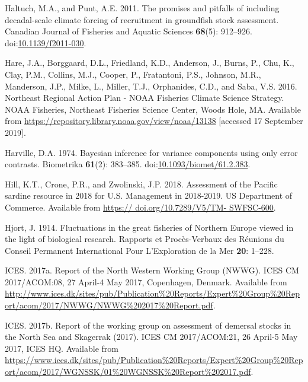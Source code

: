 \documentclass[]{article}
\begin{document}
\leavevmode\hypertarget{ref-haltuch2011Promises}{}%
Haltuch, M.A., and Punt, A.E. 2011. The promises and pitfalls of
including decadal-scale climate forcing of recruitment in groundfish
stock assessment. Canadian Journal of Fisheries and Aquatic Sciences
\textbf{68}(5): 912--926.
doi:\href{https://doi.org/10.1139/f2011-030}{10.1139/f2011-030}.

\leavevmode\hypertarget{ref-hare2016Northeast}{}%
Hare, J.A., Borggaard, D.L., Friedland, K.D., Anderson, J., Burns, P.,
Chu, K., Clay, P.M., Collins, M.J., Cooper, P., Fratantoni, P.S.,
Johnson, M.R., Manderson, J.P., Milke, L., Miller, T.J., Orphanides,
C.D., and Saba, V.S. 2016. Northeast Regional Action Plan - NOAA
Fisheries Climate Science Strategy. NOAA Fisheries, Northeast Fisheries
Science Center, Woods Hole, MA. Available from
\url{https://repository.library.noaa.gov/view/noaa/13138} {[}accessed 17
September 2019{]}.

\leavevmode\hypertarget{ref-harville1974Bayesian}{}%
Harville, D.A. 1974. Bayesian inference for variance components using
only error contrasts. Biometrika \textbf{61}(2): 383--385.
doi:\href{https://doi.org/10.1093/biomet/61.2.383}{10.1093/biomet/61.2.383}.

\leavevmode\hypertarget{ref-hill2018Assessment}{}%
Hill, K.T., Crone, P.R., and Zwolinski, J.P. 2018. Assessment of the
Pacific sardine resource in 2018 for U.S. Management in 2018-2019. US
Department of Commerce. Available from
\href{https://\%20doi.org/10.7289/V5/TM-\%20SWFSC-600}{https:// doi.org/10.7289/V5/TM- SWFSC-600}.

\leavevmode\hypertarget{ref-hjort1914Fluctuations}{}%
Hjort, J. 1914. Fluctuations in the great fisheries of Northern Europe
viewed in the light of biological research. Rapports et Procès-Verbaux
des Réunions du Conseil Permanent International Pour L'Exploration de la
Mer \textbf{20}: 1--228.

\leavevmode\hypertarget{ref-ices2017Reporta}{}%
ICES. 2017a. Report of the North Western Working Group (NWWG). ICES CM
2017/ACOM:08, 27 April-4 May 2017, Copenhagen, Denmark. Available from
\url{http://www.ices.dk/sites/pub/Publication\%20Reports/Expert\%20Group\%20Report/acom/2017/NWWG/NWWG\%202017\%20Report.pdf}.

\leavevmode\hypertarget{ref-ices2017Report}{}%
ICES. 2017b. Report of the working group on assessment of demersal
stocks in the North Sea and Skagerrak (2017). ICES CM 2017/ACOM:21, 26
April-5 May 2017, ICES HQ. Available from
\url{https://www.ices.dk/sites/pub/Publication\%20Reports/Expert\%20Group\%20Report/acom/2017/WGNSSK/01\%20WGNSSK\%20Report\%202017.pdf}.
\end{document}
